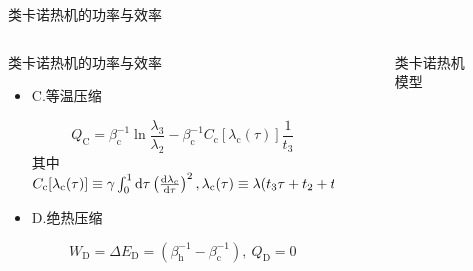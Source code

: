 \documentclass{beamer}
\newcommand{\DD}[2]{\frac{\mathrm{d} #1}{\mathrm{d} #2}}
\begin{document}
\begin{frame}{类卡诺热机的功率与效率}
    \begin{columns}
        \begin{column}{.7\textwidth}
            \begin{block}{类卡诺热机的功率与效率}
            \begin{itemize}
            \item C.等温压缩

            \begin{equation}
                Q_{\mathrm{C}} = \beta_{\mathrm{c}}^{-1} \ln{\frac{\lambda_3}{\lambda_2}} - \beta_{\mathrm{c}}^{-1} C_{\mathrm{c}} [\lambda_{\mathrm{c}}(\tau)] \frac{1}{t_3}
                \label{eq3.18}
            \end{equation}
            其中$C_{\mathrm{c}} [\lambda_{\mathrm{c}}(\tau)]\equiv \gamma \int_{0}^{1} \mathrm{d} \tau    \left(\DD{\lambda_{c}}{\tau}\right)^2,\\ \lambda_{\mathrm{c}}(\tau)\equiv\lambda(t_3 \tau + t_2 +t_1)$
            \item D.绝热压缩
            
            \begin{equation}
                W_{\mathrm{D}} = \Delta E_{\mathrm{D}} = (\beta_{\mathrm{h}}^{-1} - \beta_{\mathrm{c}}^{-1}),\  Q_{\mathrm{D}}=0
                \label{eq3.19}
            \end{equation}
            \end{itemize}
            \end{block}          
        \end{column}
        \begin{column}{.4\textwidth}
        \begin{figure}
            \centering
            \def\svgwidth{\columnwidth}
            
            \setcounter{figure}{2}
            \caption{类卡诺热机模型}
            \end{figure}
        \end{column}   
    \end{columns}
\end{frame}
\end{document}
